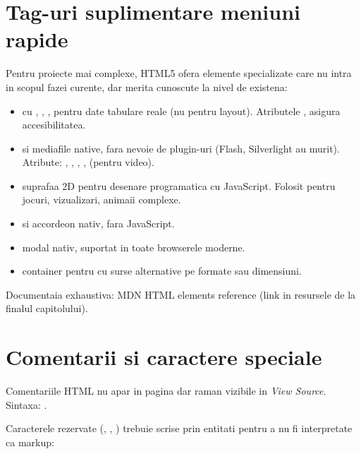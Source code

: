 \section{Tag-uri suplimentare \textendash{} meniuni rapide}

Pentru proiecte mai complexe, HTML5 ofera elemente specializate care nu intra in scopul fazei curente, dar merita cunoscute la nivel de existena:

\begin{itemize}[itemsep=2pt]
  \item {} cu , , ,  \textendash{} pentru date tabulare reale (nu pentru layout). Atributele ,  asigura accesibilitatea.
  \item {} si  \textendash{} mediafile native, fara nevoie de plugin-uri (Flash, Silverlight au murit). Atribute: , , , ,  (pentru video).
  \item {} \textendash{} suprafaa 2D pentru desenare programatica cu JavaScript. Folosit pentru jocuri, vizualizari, animaii complexe.
  \item {} si  \textendash{} accordeon nativ, fara JavaScript.
  \item {} \textendash{} modal nativ, suportat in toate browserele moderne.
  \item {} \textendash{} container pentru  cu surse alternative pe formate sau dimensiuni.
\end{itemize}

Documentaia exhaustiva: MDN \textendash{} HTML elements reference (link in resursele de la finalul capitolului).

\section{Comentarii si caractere speciale}

Comentariile HTML nu apar in pagina dar raman vizibile in \emph{View Source}. Sintaxa: .

Caracterele rezervate (\code{<}, \code{>}, \code{\&}) trebuie scrise prin entitati pentru a nu fi interpretate ca markup:

